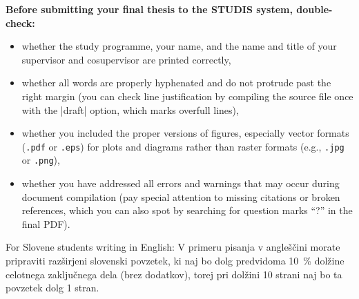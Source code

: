 \documentclass[9pt]{style/friteza}
\begin{document}
\textbf{Before submitting your final thesis to the STUDIS system, double-check:}
\begin{itemize}
  \item whether the study programme, your name, and the name and title of your supervisor and cosupervisor are printed correctly,
  \item whether all words are properly hyphenated and do not protrude past the right margin (you can check line justification by compiling the source file once with the \ltx|draft| option, which marks overfull lines),
  \item whether you included the proper versions of figures, especially vector formats ({\tt .pdf} or {\tt .eps}) for plots and diagrams rather than raster formats (e.g., {\tt .jpg} or {\tt .png}),
  \item whether you have addressed all errors and warnings that may occur during document compilation (pay special attention to missing citations or broken references, which you can also spot by searching for question marks \enquote{?} in the final PDF).
\end{itemize}




\begin{longsloveneabstract}
For Slovene students writing in English: V primeru pisanja v angleščini morate pripraviti razširjeni slovenski povzetek, ki naj bo dolg predvidoma \qty{10}{\percent} dolžine celotnega zaključnega dela (brez dodatkov), torej pri dolžini 10 strani naj bo ta povzetek dolg 1 stran.

\end{longsloveneabstract}
\end{document}

